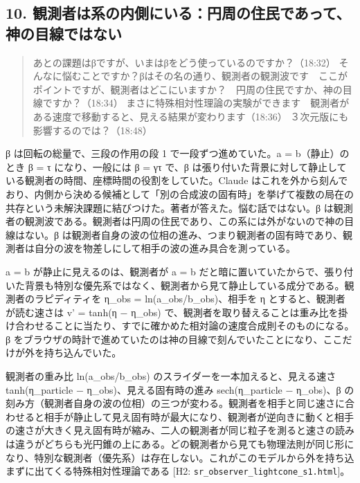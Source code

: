 \documentclass[
  a4paper,
]{ltjsarticle}
\begin{document}
\subsection{10.
観測者は系の内側にいる：円周の住民であって、神の目線ではない}\label{ux89b3ux6e2cux8005ux306fux7cfbux306eux5185ux5074ux306bux3044ux308bux5186ux5468ux306eux4f4fux6c11ux3067ux3042ux3063ux3066ux795eux306eux76eeux7ddaux3067ux306fux306aux3044}

\begin{quote}
あとの課題はβですが、いまはβをどう使っているのですか？（18:32）
そんなに悩むことですか？βはその名の通り、観測者の観測波です　ここがポイントですが、観測者はどこにいますか？　円周の住民ですか、神の目線ですか？（18:34）
まさに特殊相対性理論の実験ができます　観測者がある速度で移動すると、見える結果が変わります（18:36）
３次元版にも影響するのでは？（18:48）
\end{quote}

β は回転の総量で、三段の作用の段 1 で一段ずつ進めていた。a =
b（静止）のとき β = τ になり、一般には β = γτ で、β
は張り付いた背景に対して静止している観測者の時間、座標時間の役割をしていた。Claude
はこれを外から刻んでおり、内側から決める候補として「別の合成波の固有時」を挙げて複数の局在の共存という未解決課題に結びつけた。著者が答えた。悩む話ではない。β
は観測者の観測波である。観測者は円周の住民であり、この系には外がないので神の目線はない。β
は観測者自身の波の位相の進み、つまり観測者の固有時であり、観測者は自分の波を物差しにして相手の波の進み具合を測っている。

a = b が静止に見えるのは、観測者が a = b
だと暗に置いていたからで、張り付いた背景も特別な優先系ではなく、観測者から見て静止している成分である。観測者のラピディティを
η\_obs = ln(a\_obs/b\_obs)、相手を η とすると、観測者が読む速さは v' =
tanh(η − η\_obs)
で、観測者を取り替えることは重み比を掛け合わせることに当たり、すでに確かめた相対論の速度合成則そのものになる。β
をブラウザの時計で進めていたのは神の目線で刻んでいたことになり、ここだけが外を持ち込んでいた。

観測者の重み比 ln(a\_obs/b\_obs) のスライダーを一本加えると、見える速さ
tanh(η\_particle − η\_obs)、見える固有時の進み sech(η\_particle −
η\_obs)、β
の刻み方（観測者自身の波の位相）の三つが変わる。観測者を相手と同じ速さに合わせると相手が静止して見え固有時が最大になり、観測者が逆向きに動くと相手の速さが大きく見え固有時が縮み、二人の観測者が同じ粒子を測ると速さの読みは違うがどちらも光円錐の上にある。どの観測者から見ても物理法則が同じ形になり、特別な観測者（優先系）は存在しない。これがこのモデルから外を持ち込まずに出てくる特殊相対性理論である
{[}H2: \texttt{sr\_\allowbreak{}observer\_\allowbreak{}lightcone\_\allowbreak{}s1.html}{]}。
\end{document}
